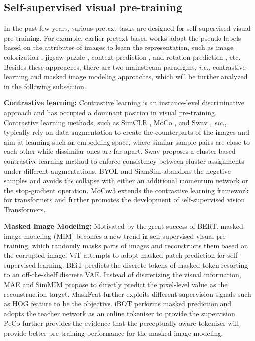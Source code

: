 \documentclass[runningheads]{llncs}
\begin{document}
\subsection{Self-supervised visual pre-training}
In the past few years, various pretext tasks are designed for self-supervised visual pre-training. For example, earlier pretext-based works adopt the pseudo labels based on the attributes of images to learn the representation, such as image colorization \cite{color}, jigsaw puzzle \cite{jigsaw}, context prediction \cite{doersch2015}, and rotation prediction \cite{rotation}, etc. Besides these approaches, there are two mainstream paradigms, \textit{i.e.}, contrastive learning and masked image modeling approaches, which will be further analyzed in the following subsection.

\textbf{Contrastive learning:} Contrastive learning is an instance-level discriminative approach and has occupied a dominant position in visual pre-training. Contrastive learning methods, such as SimCLR \cite{simclr,simclr_v2}, MoCo \cite{moco,mocov2,mocov3}, and Swav \cite{swav}, \textit{etc.}, typically rely on data augmentation to create the counterparts of the images and aim at learning such an embedding space, where similar sample pairs are close to each other while dissimilar ones are far apart. 
Swav \cite{swav} proposes a cluster-based contrastive learning method to enforce consistency between cluster assignments under different augmentations. 
BYOL \cite{byol} and SiamSim \cite{siamsam} abandons the negative samples and avoids the collapse with either an additional momentum network or the stop-gradient operation. 
MoCov3 \cite{mocov3} extends the contrastive learning framework for transformers and further promotes the development of self-supervised vision Transformers. 


\textbf{Masked Image Modeling:} Motivated by the great success of BERT, masked image modeling (MIM) \cite{beit,ibot,mae,conmim,maskfeat,simmim,cae} becomes a new trend in self-supervised visual pre-training, which randomly masks parts of images and reconstructs them based on the corrupted image. ViT \cite{vit} attempts to adopt masked patch prediction for self-supervised learning. 
BEiT \cite{beit} predicts the discrete tokens of masked token resorting to an off-the-shelf discrete VAE. Instead of discretizing the visual information, MAE \cite{mae} and SimMIM \cite{simmim} propose to directly predict the pixel-level value as the reconstruction target. MaskFeat \cite{maskfeat} further exploits different supervision signals such as HOG feature to be the objective. iBOT \cite{ibot} performs masked prediction and adopts the teacher network as an online tokenizer to provide the supervision. PeCo \cite{peco} further provides the evidence that the perceptually-aware tokenizer will provide better pre-training performance for the masked image modeling. 
\end{document}
